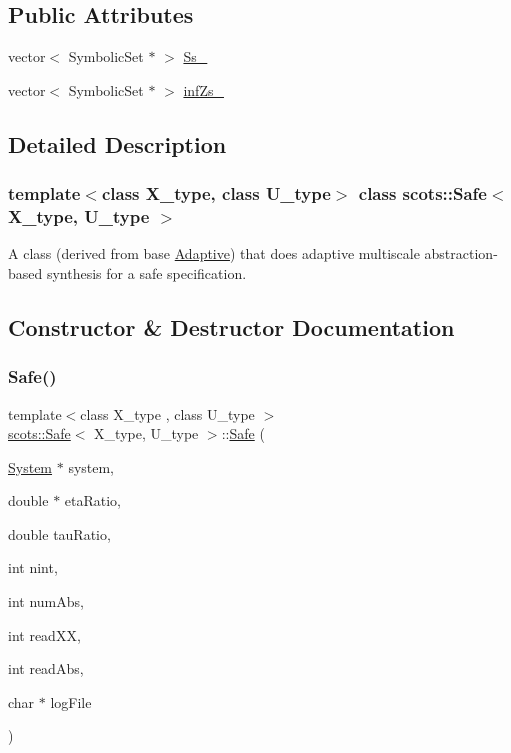 \subsection*{Public Attributes}
\begin{DoxyCompactItemize}
\item 
vector$<$ Symbolic\+Set $\ast$ $>$ \hyperlink{classscots_1_1Safe_a4c272a1e134f26e88c74a08c2703d934}{Ss\+\_\+}
\item 
vector$<$ Symbolic\+Set $\ast$ $>$ \hyperlink{classscots_1_1Safe_a30e38b9a75a8bf34efb2512465ea9468}{inf\+Zs\+\_\+}
\end{DoxyCompactItemize}


\subsection{Detailed Description}
\subsubsection*{template$<$class X\+\_\+type, class U\+\_\+type$>$\newline
class scots\+::\+Safe$<$ X\+\_\+type, U\+\_\+type $>$}

A class (derived from base \hyperlink{classscots_1_1Adaptive}{Adaptive}) that does adaptive multiscale abstraction-\/based synthesis for a safe specification. 

\subsection{Constructor \& Destructor Documentation}
\mbox{\label{classscots_1_1Safe_ab2fd1008342b2ecccadceff25d349b6a}} 
\subsubsection{\texorpdfstring{Safe()}{Safe()}}
{\footnotesize\ttfamily template$<$class X\+\_\+type , class U\+\_\+type $>$ \\
\hyperlink{classscots_1_1Safe}{scots\+::\+Safe}$<$ X\+\_\+type, U\+\_\+type $>$\+::\hyperlink{classscots_1_1Safe}{Safe} (\begin{DoxyParamCaption}\item[{\hyperlink{classscots_1_1System}{System} $\ast$}]{system,  }\item[{double $\ast$}]{eta\+Ratio,  }\item[{double}]{tau\+Ratio,  }\item[{int}]{nint,  }\item[{int}]{num\+Abs,  }\item[{int}]{read\+XX,  }\item[{int}]{read\+Abs,  }\item[{char $\ast$}]{log\+File }\end{DoxyParamCaption})\hspace{0.3cm}{\ttfamily [inline]}}


